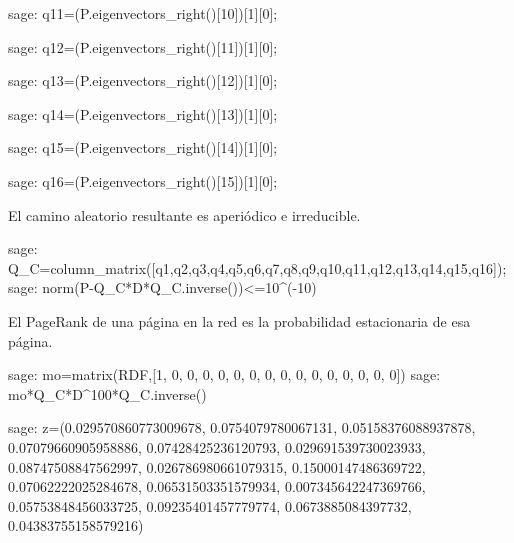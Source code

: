 \begin{sagecommandline}
    sage: q11=(P.eigenvectors_right()[10])[1][0];
\end{sagecommandline}

\begin{sagecommandline}
    sage: q12=(P.eigenvectors_right()[11])[1][0];
\end{sagecommandline}

\begin{sagecommandline}
    sage: q13=(P.eigenvectors_right()[12])[1][0];
\end{sagecommandline}

\begin{sagecommandline}
    sage: q14=(P.eigenvectors_right()[13])[1][0];
\end{sagecommandline}

\begin{sagecommandline}
    sage: q15=(P.eigenvectors_right()[14])[1][0];
\end{sagecommandline}

\begin{sagecommandline}
    sage: q16=(P.eigenvectors_right()[15])[1][0];
\end{sagecommandline}

\par El camino aleatorio resultante es aperiódico e irreducible.

\begin{sagecommandline}
    sage: Q_C=column_matrix([q1,q2,q3,q4,q5,q6,q7,q8,q9,q10,q11,q12,q13,q14,q15,q16]);
    sage: norm(P-Q_C*D*Q_C.inverse())<=10^(-10)
\end{sagecommandline}

\par El PageRank de una página en la red es la probabilidad estacionaria de esa página.
    
\begin{sagecommandline}
    sage: mo=matrix(RDF,[1, 0, 0, 0, 0, 0, 0, 0, 0, 0, 0, 0, 0, 0, 0, 0])
    sage: mo*Q_C*D^100*Q_C.inverse()
\end{sagecommandline}

\begin{sagecommandline}
    sage: z=(0.029570860773009678, 0.0754079780067131, 0.05158376088937878, 0.07079660905958886, 0.07428425236120793, 0.029691539730023933, 0.08747508847562997, 0.026786980661079315, 0.15000147486369722, 0.07062222025284678, 0.06531503351579934, 0.007345642247369766, 0.05753848456033725, 0.09235401457779774, 0.0673885084397732, 0.04383755158579216)
\end{sagecommandline}

